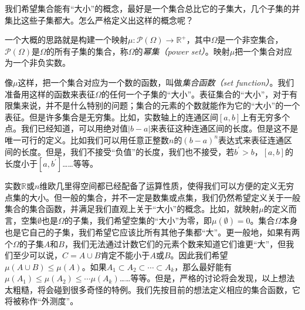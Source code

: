 \documentclass[main.tex]{subfiles}
\begin{document}
我们希望集合能有“大小”的概念，最好是一个集合总比它的子集大，几个子集的并集比这些子集都大。怎么严格定义出这样的概念呢？

一个大概的思路就是构建一个映射$\mu:\mathcal{P}\left(\Omega\right)\rightarrow\mathbb{R}^+$，其中$\Omega$是一个非空集合，$\mathcal{P}\left(\Omega\right)$是$\Omega$的所有子集的集合，称$\Omega$的\emph{幂集（power set）}。映射$\mu$把一个集合对应为一个非负实数。

像$\mu$这样，把一个集合对应为一个数的函数，叫做\emph{集合函数（set function）}。我们准备用这样的函数来表征$\Omega$的任何一个子集的“大小”。表征集合的“大小”，对于有限集来说，并不是什么特别的问题；集合的元素的个数就能作为它的“大小”的一个表征。但是许多集合是无穷集。比如，实数轴上的连通区间$\left[a,b\right]$上有无穷多个点。我们已经知道，可以用绝对值$\left|b-a\right|$来表征这种连通区间的长度。但是这不是唯一可行的定义。比如我们可以用任意正整数$n$的$\left(b-a\right)^n$表达式来表征连通区间的长度。但是，我们不接受“负值”的长度，我们也不接受，若$b^\prime>b$，$\left[a,b\right]$的长度小于$\left[a,b^\prime\right]$……等等。

实数$\mathbb{R}$或$n$维欧几里得空间都已经配备了运算性质，使得我们可以方便的定义无穷点集的大小。但一般的集合，并不一定是数集或点集，我们仍然希望定义关于一般集合的集合函数，并满足我们直观上关于“大小”的概念。比如，就映射$\mu$的定义而言，空集$\emptyset$也是$\Omega$的子集，我们希望空集的“大小”为零，即$\mu\left(\emptyset\right)=0$。集合$\Omega$本身也是它自己的子集，我们希望它应该比所有其他子集都“大”。更一般地，如果有两个$\Omega$的子集$A$和$B$，我们无法通过计数它们的元素个数来知道它们谁更“大”，但我们至少可以说，$C=A\cup B$肯定不能小于$A$或$B$。因此我们希望$\mu\left(A\cup B\right)\leq\mu\left(A\right)$。如果$A_1\subset A_2\subset\cdots\subset A_k$，那么最好能有$\mu\left(A_1\right)\leq\mu\left(A_2\right)\leq\cdots\mu\left(A_k\right)$……等等。但是，严格的讨论将会发现，以上想法太粗糙，将会碰到很多奇怪的特例。我们先按目前的想法定义相应的集合函数，它将被称作“外测度”。
\end{document}
